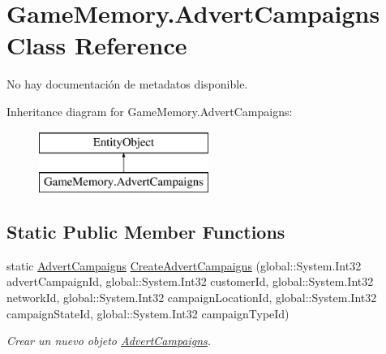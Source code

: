 \hypertarget{class_game_memory_1_1_advert_campaigns}{\section{Game\-Memory.\-Advert\-Campaigns Class Reference}
\label{class_game_memory_1_1_advert_campaigns}
}


No hay documentación de metadatos disponible.  


Inheritance diagram for Game\-Memory.\-Advert\-Campaigns\-:\begin{figure}[H]
\begin{center}
\leavevmode
\includegraphics[height=2.000000cm]{class_game_memory_1_1_advert_campaigns}
\end{center}
\end{figure}
\subsection*{Static Public Member Functions}
\begin{DoxyCompactItemize}
\item 
static \hyperlink{class_game_memory_1_1_advert_campaigns}{Advert\-Campaigns} \hyperlink{class_game_memory_1_1_advert_campaigns_af77b777a04e4f249a151540a204d5959}{Create\-Advert\-Campaigns} (global\-::\-System.\-Int32 advert\-Campaign\-Id, global\-::\-System.\-Int32 customer\-Id, global\-::\-System.\-Int32 network\-Id, global\-::\-System.\-Int32 campaign\-Location\-Id, global\-::\-System.\-Int32 campaign\-State\-Id, global\-::\-System.\-Int32 campaign\-Type\-Id)
\begin{DoxyCompactList}\small\item\em Crear un nuevo objeto \hyperlink{class_game_memory_1_1_advert_campaigns}{Advert\-Campaigns}. \end{DoxyCompactList}\end{DoxyCompactItemize}
